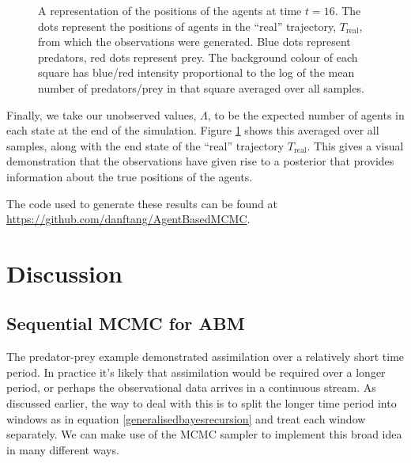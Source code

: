 \documentclass{article}
\begin{document}
\begin{figure}
	\centering
	\caption{A representation of the positions of the agents at time $t=16$. The dots represent the positions of agents in the ``real'' trajectory, $T_{\text{real}}$, from which the observations were generated. Blue dots represent predators, red dots represent prey. The background colour of each square has blue/red intensity proportional to the log of the mean number of predators/prey in that square averaged over all samples.}
	\label{figEndState}
\end{figure}

Finally, we take our unobserved values, $\Lambda$, to be the expected number of agents in each state at the end of the simulation. Figure \ref{figEndState} shows this averaged over all samples, along with the end state of the ``real'' trajectory $T_{\text{real}}$. This gives a visual demonstration that the observations have given rise to a posterior that provides information about the true positions of the agents.

The code used to generate these results can be found at \url{https://github.com/danftang/AgentBasedMCMC}.

\section{Discussion} 
\label{discussion}

 
\subsection{Sequential MCMC for ABM}

The predator-prey example demonstrated assimilation over a relatively short time period. In practice it's likely that assimilation would be required over a longer period, or perhaps the observational data arrives in a continuous stream. As discussed earlier, the way to deal with this is to split the longer time period into windows as in equation \eqref{generalisedbayesrecursion} and treat each window separately. We can make use of the MCMC sampler to implement this broad idea in many different ways.
\end{document}
